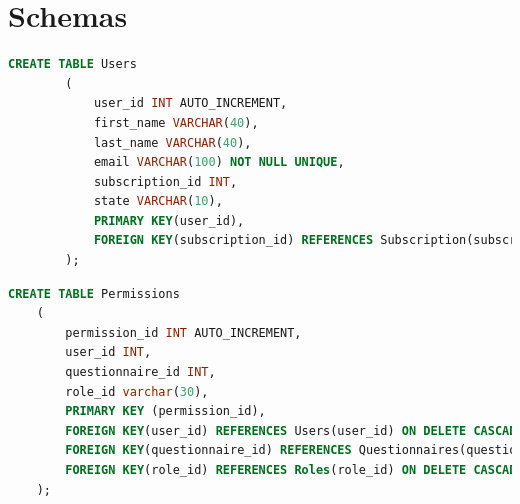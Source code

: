 \documentclass[12pt, oneside, a4paper]{article}
\begin{document}
    \section{Schemas}
    \begin{lstlisting}[language=SQL, columns=flexible, breaklines]
        CREATE TABLE Users
        (
            user_id INT AUTO_INCREMENT,
            first_name VARCHAR(40),
            last_name VARCHAR(40),
            email VARCHAR(100) NOT NULL UNIQUE,
            subscription_id INT,
            state VARCHAR(10),
            PRIMARY KEY(user_id),
            FOREIGN KEY(subscription_id) REFERENCES Subscription(subscription_id) ON DELETE CASCADE
        );
    \end{lstlisting}
    \begin{lstlisting}[language=SQL, columns=flexible, breaklines]
    CREATE TABLE Permissions
    (
        permission_id INT AUTO_INCREMENT,
        user_id INT,
        questionnaire_id INT,
        role_id varchar(30),
        PRIMARY KEY (permission_id),
        FOREIGN KEY(user_id) REFERENCES Users(user_id) ON DELETE CASCADE,
        FOREIGN KEY(questionnaire_id) REFERENCES Questionnaires(questionnaire_id) ON DELETE CASCADE,
        FOREIGN KEY(role_id) REFERENCES Roles(role_id) ON DELETE CASCADE
    );
    \end{lstlisting}
\end{document}
